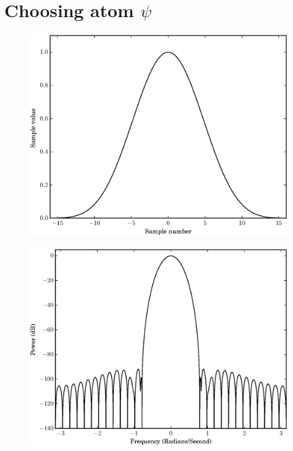 \section{Choosing atom $\psi$ \label{sec:optblackman}}

\begin{figure}[!t]
    \centering
    \includegraphics[width=\figwidthscale\textwidth]{plots/min4_blackman_td.eps}
    \CaptionWithTitle{%
    }{\label{plot:opt_blackman}}
\end{figure}

\begin{figure}[!t]
    \centering
    \includegraphics[width=\figwidthscale\textwidth]{plots/min4_blackman_fd.eps}
    \CaptionWithTitle{%
    }{}
\end{figure}


